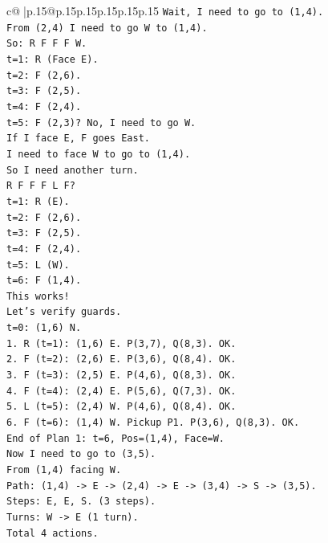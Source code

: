 \documentclass{article}
\begin{document}
{\begin{supertabular}{c@{$\;$}|p{.15\linewidth}@{}p{.15\linewidth}p{.15\linewidth}p{.15\linewidth}p{.15\linewidth}p{.15\linewidth}}
{{{\texttt{Wait, I need to go to (1,4).} \\
\texttt{From (2,4) I need to go W to (1,4).} \\
\texttt{So: R F F F W.} \\
\texttt{t=1: R (Face E).} \\
\texttt{t=2: F (2,6).} \\
\texttt{t=3: F (2,5).} \\
\texttt{t=4: F (2,4).} \\
\texttt{t=5: F (2,3)? No, I need to go W.} \\
\texttt{If I face E, F goes East.} \\
\texttt{I need to face W to go to (1,4).} \\
\texttt{So I need another turn.} \\
\texttt{R F F F L F?} \\
\texttt{t=1: R (E).} \\
\texttt{t=2: F (2,6).} \\
\texttt{t=3: F (2,5).} \\
\texttt{t=4: F (2,4).} \\
\texttt{t=5: L (W).} \\
\texttt{t=6: F (1,4).} \\
\texttt{This works!} \\
\texttt{Let's verify guards.} \\
\texttt{t=0: (1,6) N.} \\
\texttt{1. R (t=1): (1,6) E. P(3,7), Q(8,3). OK.} \\
\texttt{2. F (t=2): (2,6) E. P(3,6), Q(8,4). OK.} \\
\texttt{3. F (t=3): (2,5) E. P(4,6), Q(8,3). OK.} \\
\texttt{4. F (t=4): (2,4) E. P(5,6), Q(7,3). OK.} \\
\texttt{5. L (t=5): (2,4) W. P(4,6), Q(8,4). OK.} \\
\texttt{6. F (t=6): (1,4) W. Pickup P1. P(3,6), Q(8,3). OK.} \\
\texttt{End of Plan 1: t=6, Pos=(1,4), Face=W.} \\
\texttt{Now I need to go to (3,5).} \\
\texttt{From (1,4) facing W.} \\
\texttt{Path: (1,4) {-}> E {-}> (2,4) {-}> E {-}> (3,4) {-}> S {-}> (3,5).} \\
\texttt{Steps: E, E, S. (3 steps).} \\
\texttt{Turns: W {-}> E (1 turn).} \\
\texttt{Total 4 actions.} \\
}}}
\end{supertabular}}
\end{document}
